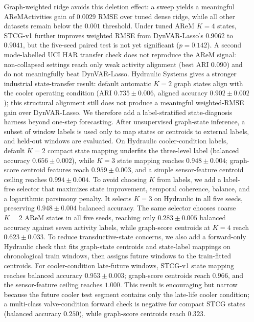 \documentclass[sigconf,review,anonymous]{acmart}
\begin{document}
Graph-weighted ridge avoids this deletion effect: a sweep yields a meaningful AReMActivities gain of $0.0029$ RMSE over tuned dense ridge, while all other datasets remain below the $0.001$ threshold.
Under tuned AReM $K=4$ states, STCG-v1 further improves weighted RMSE from DynVAR-Lasso's $0.9062$ to $0.9041$, but the five-seed paired test is not yet significant ($p=0.142$).
A second mode-labelled UCI HAR transfer check does not reproduce the AReM signal: non-collapsed settings reach only weak activity alignment (best ARI $0.090$) and do not meaningfully beat DynVAR-Lasso.
Hydraulic Systems gives a stronger industrial state-transfer result: default automatic $K=2$ graph states align with the cooler operating condition (ARI $0.735 \pm 0.006$, aligned accuracy $0.902 \pm 0.002$); this structural alignment still does not produce a meaningful weighted-RMSE gain over DynVAR-Lasso.
We therefore add a label-stratified state-diagnosis harness beyond one-step forecasting.
After unsupervised graph-state inference, a subset of window labels is used only to map states or centroids to external labels, and held-out windows are evaluated.
On Hydraulic cooler-condition labels, default $K=2$ compact state mapping underfits the three-level label (balanced accuracy $0.656 \pm 0.002$), while $K=3$ state mapping reaches $0.948 \pm 0.004$; graph-score centroid features reach $0.959 \pm 0.003$, and a simple sensor-feature centroid ceiling reaches $0.994 \pm 0.004$.
To avoid choosing $K$ from labels, we add a label-free selector that maximizes state improvement, temporal coherence, balance, and a logarithmic parsimony penalty.
It selects $K=3$ on Hydraulic in all five seeds, preserving $0.948 \pm 0.004$ balanced accuracy.
The same selector chooses coarse $K=2$ AReM states in all five seeds, reaching only $0.283 \pm 0.005$ balanced accuracy against seven activity labels, while graph-score centroids at $K=4$ reach $0.623 \pm 0.033$.
To reduce transductive-state concerns, we also add a forward-only Hydraulic check that fits graph-state centroids and state-label mappings on chronological train windows, then assigns future windows to the train-fitted centroids.
For cooler-condition late-future windows, STCG-v1 state mapping reaches balanced accuracy $0.953 \pm 0.003$; graph-score centroids reach $0.966$, and the sensor-feature ceiling reaches $1.000$.
This result is encouraging but narrow because the future cooler test segment contains only the late-life cooler condition; a multi-class valve-condition forward check is negative for compact STCG states (balanced accuracy $0.250$), while graph-score centroids reach $0.323$.
\end{document}
